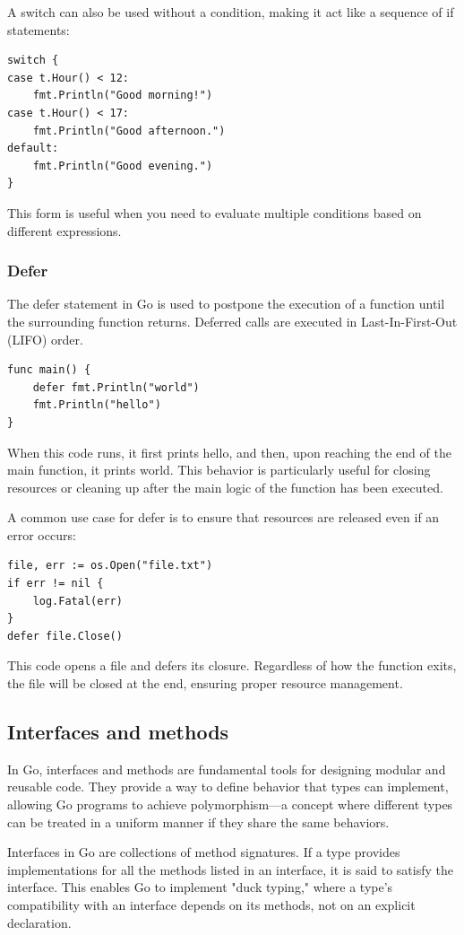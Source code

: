 A switch can also be used without a condition, making it act like a sequence of if statements:

\begin{verbatim}
switch {
case t.Hour() < 12:
    fmt.Println("Good morning!")
case t.Hour() < 17:
    fmt.Println("Good afternoon.")
default:
    fmt.Println("Good evening.")
}
\end{verbatim}
This form is useful when you need to evaluate multiple conditions based on different expressions.

\subsubsection{Defer}
The defer statement in Go is used to postpone the execution of a function until the surrounding function returns. Deferred calls are executed in Last-In-First-Out (LIFO) order.

\begin{verbatim}
func main() {
    defer fmt.Println("world")
    fmt.Println("hello")
}
\end{verbatim}
When this code runs, it first prints hello, and then, upon reaching the end of the main function, it prints world. This behavior is particularly useful for closing resources or cleaning up after the main logic of the function has been executed.

A common use case for defer is to ensure that resources are released even if an error occurs:
\begin{verbatim}
file, err := os.Open("file.txt")
if err != nil {
    log.Fatal(err)
}
defer file.Close()
\end{verbatim}
This code opens a file and defers its closure. Regardless of how the function exits, the file will be closed at the end, ensuring proper resource management.

\subsection*{Interfaces and methods}
In Go, interfaces and methods are fundamental tools for designing modular and reusable code. They provide a way to define behavior that types can implement, allowing Go programs to achieve polymorphism—a concept where different types can be treated in a uniform manner if they share the same behaviors.

Interfaces in Go are collections of method signatures. If a type provides implementations for all the methods listed in an interface, it is said to satisfy the interface. This enables Go to implement "duck typing," where a type’s compatibility with an interface depends on its methods, not on an explicit declaration.

